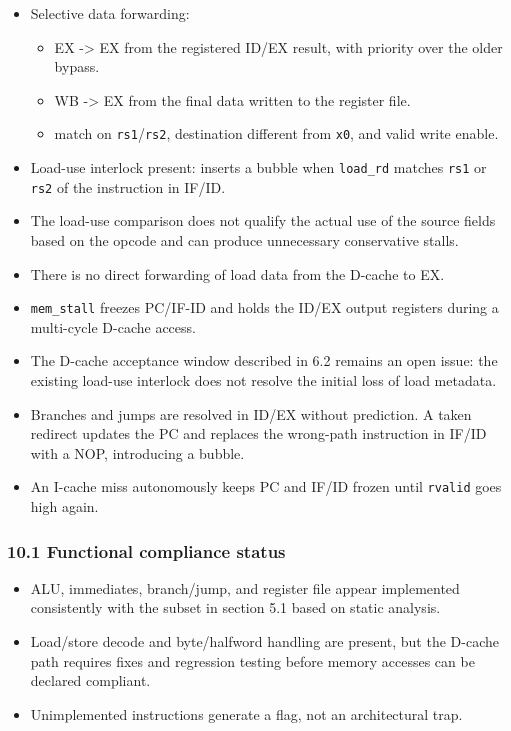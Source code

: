 \documentclass[]{article}
\providecommand{\tightlist}{%
  \setlength{\itemsep}{0pt}\setlength{\parskip}{0pt}}
\begin{document}
\begin{itemize}
\tightlist
\item
  Selective data forwarding:

  \begin{itemize}
  \tightlist
  \item
    EX -\textgreater{} EX from the registered ID/EX result, with
    priority over the older bypass.
  \item
    WB -\textgreater{} EX from the final data written to the register
    file.
  \item
    match on \texttt{rs1}/\texttt{rs2}, destination different from
    \texttt{x0}, and valid write enable.
  \end{itemize}
\item
  Load-use interlock present: inserts a bubble when \texttt{load\_rd}
  matches \texttt{rs1} or \texttt{rs2} of the instruction in IF/ID.
\item
  The load-use comparison does not qualify the actual use of the source
  fields based on the opcode and can produce unnecessary conservative
  stalls.
\item
  There is no direct forwarding of load data from the D-cache to EX.
\item
  \texttt{mem\_stall} freezes PC/IF-ID and holds the ID/EX output
  registers during a multi-cycle D-cache access.
\item
  The D-cache acceptance window described in 6.2 remains an open issue:
  the existing load-use interlock does not resolve the initial loss of
  load metadata.
\item
  Branches and jumps are resolved in ID/EX without prediction. A taken
  redirect updates the PC and replaces the wrong-path instruction in
  IF/ID with a NOP, introducing a bubble.
\item
  An I-cache miss autonomously keeps PC and IF/ID frozen until
  \texttt{rvalid} goes high again.
\end{itemize}

\hypertarget{101-functional-compliance-status}{%
\subsubsection{10.1 Functional compliance
status}\label{101-functional-compliance-status}}

\begin{itemize}
\tightlist
\item
  ALU, immediates, branch/jump, and register file appear implemented
  consistently with the subset in section 5.1 based on static analysis.
\item
  Load/store decode and byte/halfword handling are present, but the
  D-cache path requires fixes and regression testing before memory
  accesses can be declared compliant.
\item
  Unimplemented instructions generate a flag, not an architectural trap.
\end{itemize}
\end{document}
